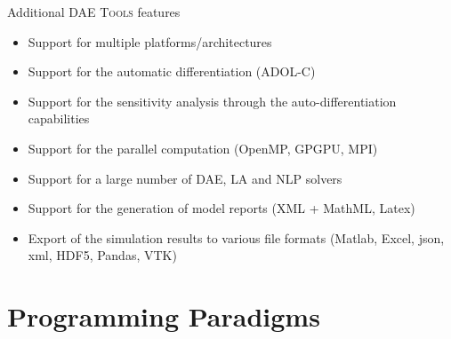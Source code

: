 \documentclass[compress,newPxFont,sthlmFooter]{beamer}
\begin{document}

\begin{frame}{Additional \textsc{DAE Tools} features}
    \begin{itemize}
        \item Support for \alert{multiple platforms/architectures} 
        \item Support for the \alert{automatic differentiation} (ADOL-C)
        \item Support for the \alert{sensitivity analysis} through the auto-differentiation capabilities
        \item Support for the \alert{parallel} computation (OpenMP, GPGPU, MPI)
        \item Support for a large number of \alert{DAE}, \alert{LA} and \alert{NLP} solvers 
        \item Support for the generation of \alert{model reports} (XML + MathML, Latex)
        \item \alert{Export} of the \alert{simulation results} to various file formats (Matlab, Excel, json, xml, HDF5, Pandas, VTK)
    \end{itemize}
\end{frame}

\section{Programming Paradigms}
\end{document}
